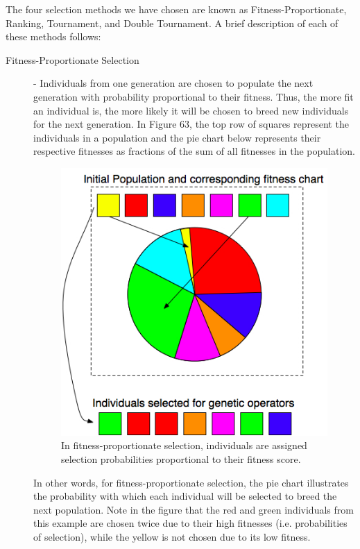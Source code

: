 \documentclass[12pt]{report} 	%
\numberwithin{figure}{chapter}
\numberwithin{table}{chapter}
\numberwithin{equation}{chapter}
\begin{document}
\begin{flushleft}
The four selection methods we have chosen are known as Fitness-Proportionate, Ranking, Tournament, and Double Tournament. A brief description of each of these methods follows:
\begin{description}
\item [Fitness-Proportionate Selection] - Individuals from one generation are chosen to populate the next generation with probability proportional to their fitness. Thus, the more fit an individual is, the more likely it will be chosen to breed new individuals for the next generation. In Figure 63, the top row of squares represent the individuals in a population and the pie chart below represents their respective fitnesses as fractions of the sum of all fitnesses in the population. \begin{figure}[h!]
\begin{center}
\includegraphics[scale = 0.7]{PieChartSelection}
\caption[Fitness-proportionate selection]{In fitness-proportionate selection, individuals are assigned selection probabilities proportional to their fitness score.}
\end{center}
\end{figure}
In other words, for fitness-proportionate selection, the pie chart illustrates the probability with which each individual will be selected to breed the next population. Note in the figure that the red and green individuals from this example are chosen twice due to their high fitnesses (i.e. probabilities of selection), while the yellow is not chosen due to its low fitness.


\end{description}
\end{flushleft}
\end{document}
